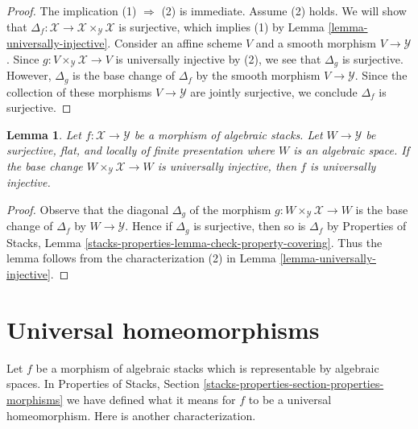 \documentclass{stacks-project}
\theoremstyle{plain}
\newtheorem{lemma}[subsection]{Lemma}
\theoremstyle{definition}
\theoremstyle{remark}
\numberwithin{equation}{subsection}
\begin{document}
\begin{proof}
The implication (1) $\Rightarrow$ (2) is immediate.
Assume (2) holds. We will show that
$\Delta_f : \mathcal{X} \to \mathcal{X} \times_\mathcal{Y} \mathcal{X}$
is surjective, which implies (1) by Lemma \ref{lemma-universally-injective}.
Consider an affine scheme $V$ and a smooth morphism
$V \to \mathcal{Y}$. Since
$g : V \times_\mathcal{Y} \mathcal{X} \to V$
is universally injective by (2), we see that
$\Delta_g$ is surjective.
However, $\Delta_g$ is the base change of $\Delta_f$
by the smooth morphism $V \to \mathcal{Y}$.
Since the collection of these morphisms $V \to \mathcal{Y}$
are jointly surjective, we conclude $\Delta_f$ is surjective.
\end{proof}

\begin{lemma}
\label{lemma-check-universally-injective-covering}
Let $f : \mathcal{X} \to \mathcal{Y}$ be a morphism of algebraic stacks.
Let $W \to \mathcal{Y}$ be surjective, flat, and locally of finite
presentation where $W$ is an algebraic space. If the base change
$W \times_\mathcal{Y} \mathcal{X} \to W$ is universally injective,
then $f$ is universally injective.
\end{lemma}

\begin{proof}
Observe that the diagonal $\Delta_g$ of the morphism
$g : W \times_\mathcal{Y} \mathcal{X} \to W$
is the base change of $\Delta_f$ by $W \to \mathcal{Y}$.
Hence if $\Delta_g$ is surjective, then so is $\Delta_f$
by Properties of Stacks, Lemma
\ref{stacks-properties-lemma-check-property-covering}.
Thus the lemma follows from the characterization (2)
in Lemma \ref{lemma-universally-injective}.
\end{proof}








\section{Universal homeomorphisms}
\label{section-universal-homeomorphisms}

\noindent
Let $f$ be a morphism of algebraic stacks which is representable by
algebraic spaces. In
Properties of Stacks, Section
\ref{stacks-properties-section-properties-morphisms}
we have defined what it means for $f$ to be a universal homeomorphism.
Here is another characterization.
\end{document}
